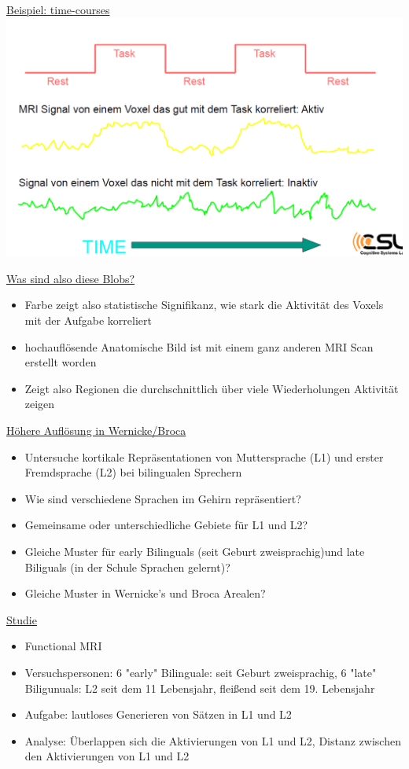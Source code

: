 \documentclass[a4paper,10pt,oneside]{article}
\begin{document}
\underline{Beispiel: time-courses} \\
\includegraphics[scale=0.2]{Grafiken/1831.png}

\underline{Was sind also diese Blobs?} \\
	\begin{itemize}
		\item Farbe zeigt also statistische Signifikanz, wie stark die Aktivität des Voxels mit der Aufgabe korreliert
		\item hochauflösende Anatomische Bild ist mit einem ganz anderen MRI Scan erstellt worden 
		\item Zeigt also Regionen die durchschnittlich über viele Wiederholungen Aktivität zeigen
	\end{itemize}
	
\underline{Höhere Auflösung in Wernicke/Broca} \\
	\begin{itemize}
		\item Untersuche kortikale Repräsentationen von Muttersprache (L1) und erster Fremdsprache (L2) bei bilingualen Sprechern
		\item Wie sind verschiedene Sprachen im Gehirn repräsentiert?
		\item Gemeinsame oder unterschiedliche Gebiete für L1 und L2?
		\item Gleiche Muster für early Bilinguals (seit Geburt zweisprachig)und late Biliguals (in der Schule Sprachen gelernt)?
		\item Gleiche Muster in Wernicke's und Broca Arealen?
	\end{itemize}
	
\underline{Studie} \\
	\begin{itemize}
		\item Functional MRI
		\item Versuchspersonen: 6 "early" Bilinguale: seit Geburt zweisprachig, 6 "late" Biligunuals: L2 seit dem 11 Lebensjahr, fleißend seit dem 19. Lebensjahr
		\item Aufgabe: lautloses Generieren von Sätzen in L1 und L2
		\item Analyse: Überlappen sich die Aktivierungen von L1 und L2, Distanz zwischen den Aktivierungen von L1 und L2
	\end{itemize}
	
\end{document}
